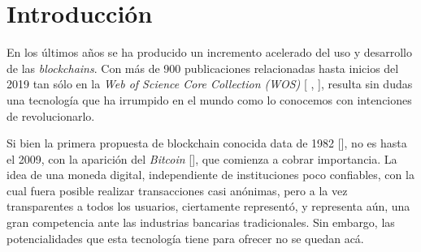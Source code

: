 \chapter*{Introducción}\label{chapter:introduction}

En los \'ultimos a\~nos se ha producido un incremento acelerado del uso y desarrollo de las \emph{blockchains}. Con m\'as de 900 publicaciones relacionadas hasta inicios del 2019 tan s\'olo en la \emph{Web of Science Core Collection (WOS)} [\cite{xu2019systematic} , \cite{yli2016current}], resulta sin dudas una tecnolog\'ia que ha irrumpido en el mundo como lo conocemos con intenciones de revolucionarlo. %


Si bien la primera propuesta de blockchain conocida data de 1982 [\cite{chaum1979computer}], no es hasta el 2009, con la aparici\'on del \emph{Bitcoin} [\cite{nakamoto2008bitcoin}], que comienza a cobrar importancia. La idea de una moneda digital, independiente de instituciones poco confiables, con la cual fuera posible realizar transacciones casi an\'onimas, pero a la vez transparentes a todos los usuarios, ciertamente represent\'o, y representa a\'un, una gran competencia ante las industrias bancarias tradicionales. Sin embargo, las potencialidades que esta tecnolog\'ia tiene para ofrecer no se quedan ac\'a. %


